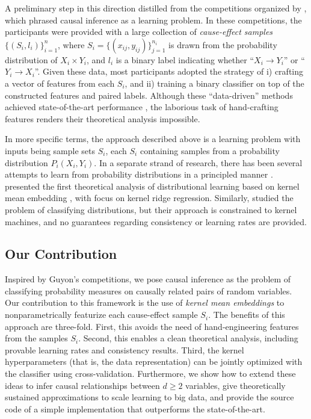 \documentclass{article}
\begin{document}
A preliminary step in this direction distilled from the
competitions organized by \citet{Kaggle13,Codalab14}, which phrased causal
inference as a learning problem.  In these competitions, the participants were
provided with a large collection of \emph{cause-effect samples}
$\{(S_i,l_i)\}_{i=1}^n$, where $S_i = \{(x_{ij},y_{ij})\}_{j=1}^{n_i}$ is drawn
from the probability distribution of $X_i \times Y_i$, and $l_i$ is a binary
label indicating whether ``$X_i \to Y_i$'' or ``$Y_i \to X_i$''. Given these
data, most participants adopted the strategy of i) crafting a vector of
features from each $S_i$, and ii) training a binary classifier on top of the
constructed features and paired labels. Although these ``data-driven'' methods
achieved state-of-the-art performance \citep{Kaggle13}, the laborious task of
hand-crafting features renders their theoretical analysis impossible.

In more specific terms, the approach described above is a learning problem with
inputs being sample sets $S_i$, each $S_i$ containing samples from a
probability distribution $P_i(X_i,Y_i)$.  In a separate strand of research,
there has been several attempts to learn from probability distributions in a
principled manner \citep{Jebara04,Hein04,Cuturi05,Martins09,Muandet12}.
\citet{Szabo14b} presented the first theoretical analysis of distributional
learning based on kernel mean embedding \citep{Smola07Hilbert}, with focus on
kernel ridge regression. Similarly, \citet{Muandet12} studied the problem of
classifying distributions, but their approach is constrained to kernel
machines, and no guarantees regarding consistency or learning rates are
provided.

\subsection{Our Contribution}

Inspired by Guyon's competitions, we pose causal inference as the problem of
classifying probability measures on causally related pairs of random variables.
Our contribution to this framework is the use of \emph{kernel mean embeddings}
to nonparametrically {featurize} each cause-effect sample $S_i$.  The benefits
of this approach are three-fold. First, this avoids the need of
hand-engineering features from the samples $S_i$. Second, this enables a
clean theoretical analysis, including provable learning rates and consistency
results.  Third, the kernel hyperparameters (that is, the data representation)
can be jointly optimized with the classifier using cross-validation.
Furthermore, we show how to extend these ideas to infer causal relationships
between $d \geq 2$ variables, give theoretically sustained approximations to scale
learning to big data, and provide the source code of a simple implementation
that outperforms the state-of-the-art.
\end{document}
